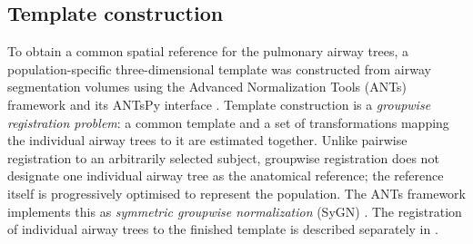 
\subsection[Template construction]{Template construction}
\label{sec:template}             %

To obtain a common spatial reference for the pulmonary airway trees, a
population-specific three-dimensional template was constructed from airway
segmentation volumes using the Advanced Normalization Tools (ANTs) framework and
its ANTsPy interface \cite{tustison2021antsx}. Template construction is a
\emph{groupwise registration problem}: a common template and a set of
transformations mapping the individual airway trees to it are estimated
together. Unlike pairwise registration to an arbitrarily selected subject,
groupwise registration does not designate one individual airway tree as the
anatomical reference; the reference itself is progressively optimised to
represent the population. The ANTs framework implements this as \emph{symmetric
groupwise normalization} (SyGN) \cite{avants2010sygn}. The registration of
individual airway trees to the finished template is described separately in
.


